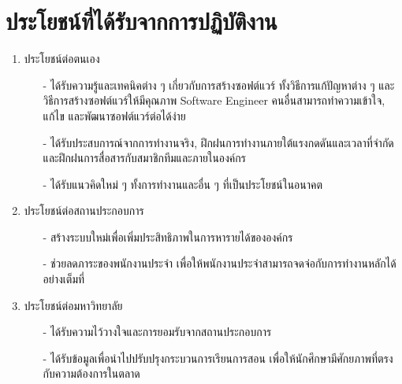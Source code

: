 \section{ประโยชน์ที่ได้รับจากการปฏิบัติงาน}
\begin{enumerate}
	\item ประโยชน์ต่อตนเอง
	\begin{itemize}
		\item[-] ได้รับความรู้และเทคนิคต่าง ๆ เกี่ยวกับการสร้างซอฟต์แวร์ ทั้งวิธีการแก้ปัญหาต่าง ๆ และวิธีการสร้างซอฟต์แวร์ให้มีคุณภาพ Software Engineer คนอื่นสามารถทำความเข้าใจ, แก้ไข และพัฒนาซอฟต์แวร์ต่อได้ง่าย	
		\item[-] ได้รับประสบการณ์จากการทำงานจริง, ฝึกฝนการทำงานภายใต้แรงกดดันและเวลาที่จำกัด และฝึกฝนการสื่อสารกับสมาชิกทีมและภายในองค์กร
		\item[-] ได้รับแนวคิดใหม่ ๆ ทั้งการทำงานและอื่น ๆ ที่เป็นประโยชน์ในอนาคต
	\end{itemize}
	\item ประโยชน์ต่อสถานประกอบการ
	\begin{itemize}
		\item[-] สร้างระบบใหม่เพื่อเพิ่มประสิทธิภาพในการหารายได้ขององค์กร
		\item[-] ช่วยลดภาระของพนักงานประจำ เพื่อให้พนักงานประจำสามารถจดจ่อกับการทำงานหลักได้อย่างเต็มที่
	\end{itemize}
	\item ประโยชน์ต่อมหาวิทยาลัย
	\begin{itemize}
		\item[-] ได้รับความไว้วางใจและการยอมรับจากสถานประกอบการ
		\item[-] ได้รับข้อมูลเพื่อนำไปปรับปรุงกระบวนการเรียนการสอน เพื่อให้นักศึกษามีศักยภาพที่ตรงกับความต้องการในตลาด
	\end{itemize}
\end{enumerate}

